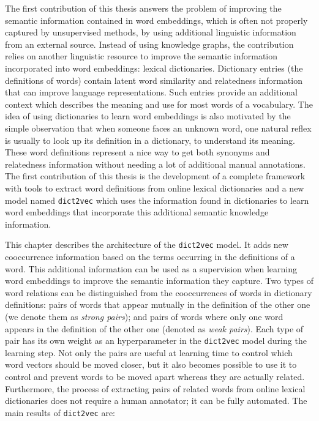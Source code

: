   The first contribution of this thesis answers the problem of improving the
  semantic information contained in word embeddings, which is often not properly
  captured by unsupervised methods, by using additional linguistic information
  from an external source. Instead of using knowledge graphs, the contribution
  relies on another linguistic resource to improve the semantic information
  incorporated into word embeddings: lexical dictionaries. Dictionary entries
  (the definitions of words) contain latent word similarity and relatedness
  information that can improve language representations. Such entries provide an
  additional context which describes the meaning and use for most words of a
  vocabulary. The idea of using dictionaries to learn word embeddings is also
  motivated by the simple observation that when someone faces an unknown word,
  one natural reflex is usually to look up its definition in a dictionary, to
  understand its meaning. These word definitions represent a nice way to get
  both synonyms and relatedness information without needing a lot of additional
  manual annotations. The first contribution of this thesis is the development
  of a complete framework with tools to extract word definitions from online
  lexical dictionaries and a new model named \texttt{dict2vec} which uses the
  information found in dictionaries to learn word embeddings that incorporate
  this additional semantic knowledge information.\medskip

  This chapter describes the architecture of the \texttt{dict2vec} model. It
  adds new cooccurrence information based on the terms occurring in the
  definitions of a word. This additional information can be used as a
  supervision when learning word embeddings to improve the semantic information
  they capture. Two types of word relations can be distinguished from the
  cooccurrences of words in dictionary definitions: pairs of words that appear
  mutually in the definition of the other one (we denote them as \textit{strong
  pairs}); and pairs of words where only one word appears in the definition of
  the other one (denoted as \textit{weak pairs}). Each type of pair has its own
  weight as an hyperparameter in the \texttt{dict2vec} model during the learning
  step. Not only the pairs are useful at learning time to control which word
  vectors should be moved closer, but it also becomes possible to use it to
  control and prevent words to be moved apart whereas they are actually related.
  Furthermore, the process of extracting pairs of related words from online
  lexical dictionaries does not require a human annotator; it can be fully
  automated. The main results of \texttt{dict2vec} are:

